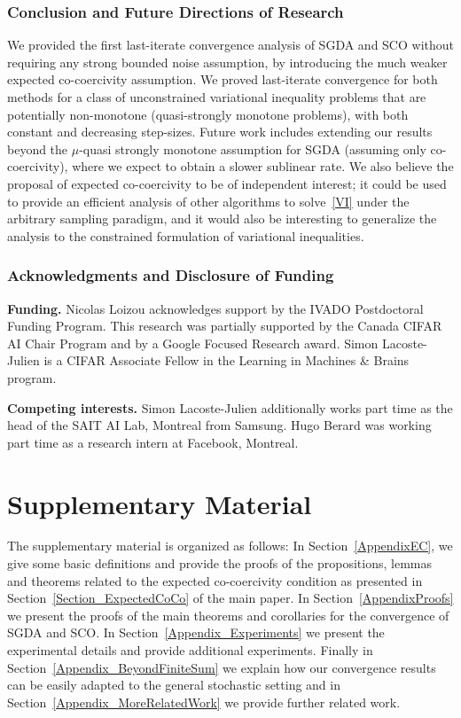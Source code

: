\documentclass{article}
\begin{document}
\section{Conclusion and Future Directions of Research}
\vspace{-2mm}
We provided the first last-iterate convergence analysis of SGDA and SCO without requiring any strong bounded noise assumption, by introducing the much weaker expected co-coercivity assumption. We proved last-iterate convergence for both methods for a class of unconstrained variational inequality problems that are potentially non-monotone (quasi-strongly monotone problems), with both constant and decreasing step-sizes. Future work includes extending our results beyond the $\mu$-quasi strongly monotone assumption for SGDA (assuming only co-coercivity), where we expect to obtain a slower sublinear rate. We also believe the proposal of expected co-coercivity to be of independent interest; it could be used to provide an efficient analysis of other algorithms to solve~\eqref{VI} under the arbitrary sampling paradigm, and it would also be interesting to generalize the analysis to the constrained formulation of variational inequalities. 

\section*{Acknowledgments and Disclosure of Funding}

\textbf{Funding.} Nicolas Loizou acknowledges support by the IVADO Postdoctoral Funding Program. This research was partially supported by the Canada CIFAR AI Chair Program and by a Google Focused Research award. Simon Lacoste-Julien is a CIFAR
Associate Fellow in the Learning in Machines \& Brains program.

\textbf{Competing interests.}  Simon Lacoste-Julien additionally works part time as the head of the SAIT AI Lab, Montreal from Samsung. Hugo Berard was working part time as a research intern at Facebook, Montreal.

{
\small


}
\newpage

\appendix 

\part*{Supplementary Material}
The supplementary material is organized as follows: In Section~\ref{AppendixEC}, we give some basic definitions and provide the proofs of the propositions, lemmas and theorems related to the expected
co-coercivity condition as presented in Section~\ref{Section_ExpectedCoCo} of the main paper. 
In Section~\ref{AppendixProofs} we present the proofs of the main
theorems and corollaries for the convergence of SGDA and SCO. 
In Section~\ref{Appendix_Experiments} we present the experimental details and provide additional experiments. Finally in Section~\ref{Appendix_BeyondFiniteSum} we explain how our convergence results can be easily adapted to the general stochastic setting and in Section~\ref{Appendix_MoreRelatedWork} we provide further related work.
\end{document}
